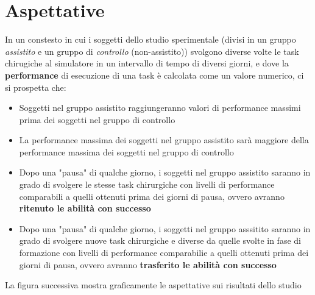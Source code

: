 \documentclass{article}
\begin{document}
\section{Aspettative}
In un constesto in cui i soggetti dello studio sperimentale (divisi in un gruppo \textit{assistito} e un gruppo di \textit{controllo} (non-assistito)) svolgono diverse volte le task chirugiche al simulatore in un intervallo di tempo di diversi giorni, e dove la \textbf{performance} di esecuzione di una task è calcolata come un valore numerico, ci si prospetta che:
\begin{itemize}
  \item Soggetti nel gruppo assistito raggiungeranno valori di performance massimi prima dei soggetti nel gruppo di controllo
  \item La performance massima dei soggetti nel gruppo assistito sarà maggiore della performance massima dei soggetti nel gruppo di controllo
  \item Dopo una "pausa" di qualche giorno, i soggetti nel gruppo assistito saranno in grado di svolgere le stesse task chirurgiche con livelli di performance comparabili a quelli ottenuti prima dei giorni di pausa, ovvero avranno \textbf{ritenuto le abilità con successo}
  \item Dopo una "pausa" di qualche giorno, i soggetti nel gruppo asssitito saranno in grado di svolgere nuove task chirurgiche e diverse da quelle svolte in fase di formazione con livelli di performance comparabilie a quelli ottenuti prima dei giorni di pausa, ovvero avranno \textbf{trasferito le abilità con successo} 
\end{itemize} 
La figura successiva mostra graficamente le aspettative sui risultati dello studio
\end{document}
